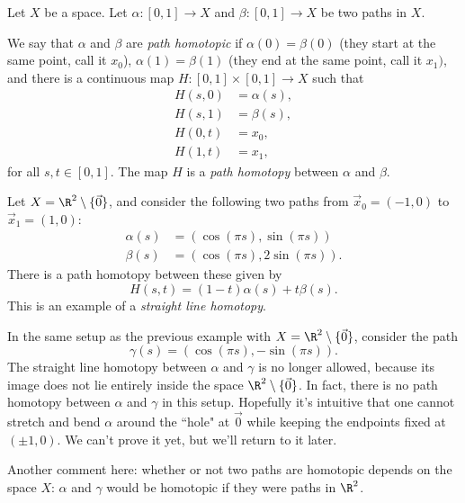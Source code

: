 \documentclass[noname]{notes}
\begin{document}
\begin{definition}
	Let $X$ be a space. Let $\alpha \colon [0,1] \to X$ and $\beta \colon [0,1] \to X$ be two paths in $X$. 
	
	We say that $\alpha$ and $\beta$ are \textit{path homotopic} if $\alpha(0) = \beta(0)$ (they start at the same point, call it $x_0$), $\alpha(1) = \beta(1)$ (they end at the same point, call it $x_1)$, and  
	there is a continuous map $H \colon [0,1] \times [0,1] \to X$ such that 
	\begin{align*}
		H(s,0) &= \alpha(s),\\
		H(s,1) &= \beta(s),\\
		H(0,t) &= x_0,\\
		H(1,t) &= x_1,
	\end{align*}
	for all $s,t \in [0,1]$. The map $H$ is a \textit{path homotopy} between $\alpha$ and $\beta$. 
\end{definition}

\begin{example}
	Let $X = \R^2 \setminus \{\vec 0\}$, and consider the following two paths from $\vec x_0 = (-1,0)$ to $\vec x_1 = (1,0)$: 
	\begin{align*}
		\alpha(s) &= (\cos(\pi s), \sin(\pi s))\\
		\beta(s) &= (\cos(\pi s), 2 \sin(\pi s)). 
	\end{align*}
	There is a path homotopy between these given by 
	\[
		H(s,t) = (1-t)\alpha(s) + t \beta(s). 
	\]
	This is an example of a \textit{straight line homotopy}. 
\end{example}

\begin{example}
	In the same setup as the previous example with $X = \R^2 \setminus \{\vec 0\}$, consider the path 
	\[
		\gamma(s) = (\cos(\pi s), - \sin(\pi s)). 
	\]
	The straight line homotopy between $\alpha$ and $\gamma$ is no longer allowed, because its image does not lie entirely inside the space $\R^2 \setminus \{\vec 0\}$. In fact, there is no path homotopy between $\alpha$ and $\gamma$ in this setup. Hopefully it's intuitive that one cannot stretch and bend $\alpha$ around the ``hole" at $\vec 0$ while keeping the endpoints fixed at $(\pm 1, 0)$. We can't prove it yet, but we'll return to it later. 
	
	Another comment here: whether or not two paths are homotopic depends on the space $X$: $\alpha$ and $\gamma$ would be homotopic if they were paths in $\R^2$. 
\end{example}
\end{document}
